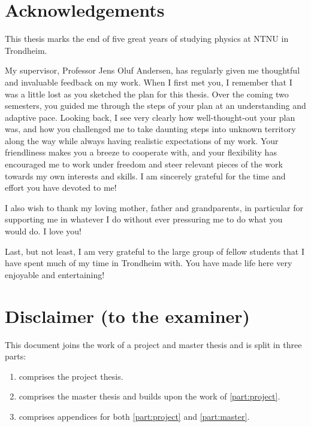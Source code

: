 \chapter*{Acknowledgements}

This thesis marks the end of five great years of studying physics at NTNU in Trondheim.

My supervisor, Professor Jens Oluf Andersen,
has regularly given me thoughtful and invaluable feedback on my work.
When I first met you,
I remember that I was a little lost as you sketched the plan for this thesis.
Over the coming two semesters, you guided me through the steps of your plan at an understanding and adaptive pace.
Looking back, I see very clearly how well-thought-out your plan was,
and how you challenged me to take daunting steps into unknown territory along the way
while always having realistic expectations of my work.
Your friendliness makes you a breeze to cooperate with,
and your flexibility has encouraged me to work under freedom and steer relevant pieces of the work towards my own interests and skills.
I am sincerely grateful for the time and effort you have devoted to me!

I also wish to thank my loving mother, father and grandparents,
in particular for supporting me in whatever I do
without ever pressuring me to do what you would do.
I love you!

Last, but not least, I am very grateful to the large group of fellow students that I have spent much of my time in Trondheim with.
You have made life here very enjoyable and entertaining!


\chapter*{Disclaimer (to the examiner)}

This document joins the work of a project and master thesis and is split in three parts:
\begin{enumerate}
\item {} comprises the project thesis.
\item {} comprises the master thesis and builds upon the work of \cref{part:project}.
\item {} comprises appendices for both \cref{part:project} and \cref{part:master}.
\end{enumerate}

